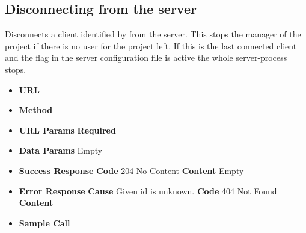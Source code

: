 \subsection{Disconnecting from the server}
Disconnects a client identified by  from the server. This stops the
manager of the project if there is no user for the project left.
If this is the last connected client and the flag 
in the server configuration file is active the whole server-process stops.

\begin{itemize}
\item \textbf{URL} 
\item \textbf{Method} 

\item \textbf{URL Params}
  \newline\textbf{Required} 

\item \textbf{Data Params} Empty

\item \textbf{Success Response}
  \newline\textbf{Code} 204 No Content
  \newline\textbf{Content} Empty

\item \textbf{Error Response}
  \newline\textbf{Cause} Given id is unknown.
  \newline\textbf{Code} 404 Not Found
  \newline\textbf{Content} 

\item \textbf{Sample Call}
\end{itemize}
